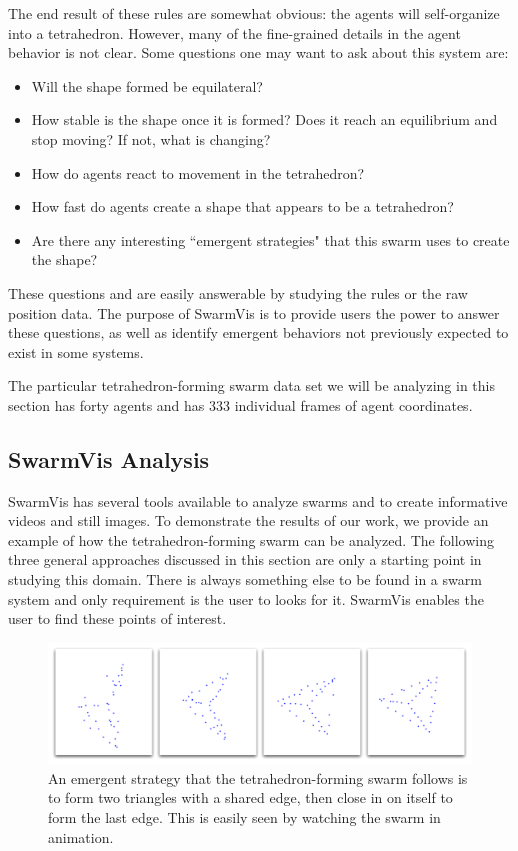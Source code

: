 \documentclass[conference]{IEEEtran}
\begin{document}
The end result of these rules are somewhat obvious: the agents will self-organize into a tetrahedron.
However, many of the fine-grained details in the agent behavior is not clear.
Some questions one may want to ask about this system are: 
\begin{itemize}
\item Will the shape formed be equilateral?
\item How stable is the shape once it is formed? Does it reach an equilibrium and stop moving? If not, what is changing?
\item How do agents react to movement in the tetrahedron?
\item How fast do agents create a shape that appears to be a tetrahedron?
\item Are there any interesting ``emergent strategies" that this swarm uses to create the shape?
\end{itemize}
These questions and are easily answerable by studying the rules or the raw position data.
The purpose of SwarmVis is to provide users the power to answer these questions,
as well as identify emergent behaviors not previously expected to exist in some systems.

The particular tetrahedron-forming swarm data set we will be analyzing in this section has forty agents
and has 333 individual frames of agent coordinates.

\subsection{SwarmVis Analysis}
SwarmVis has several tools available to analyze swarms and to create informative videos and still images.
To demonstrate the results of our work, we provide an example of how the tetrahedron-forming swarm
can be analyzed.
The following three general approaches discussed in this section are only a starting point in studying this domain.
There is always something else to be found in a swarm system and only requirement is the user to looks for it.
SwarmVis enables the user to find these points of interest.


\begin{figure}
\centering
\includegraphics[scale=.21]{images/tetraclosing.pdf}
\caption{
An emergent strategy that the tetrahedron-forming swarm follows is to form two triangles with a shared edge, then
close in on itself to form the last edge. This is easily seen by watching the swarm in animation.}
\label{TetraClosing}
\end{figure}
\end{document}
